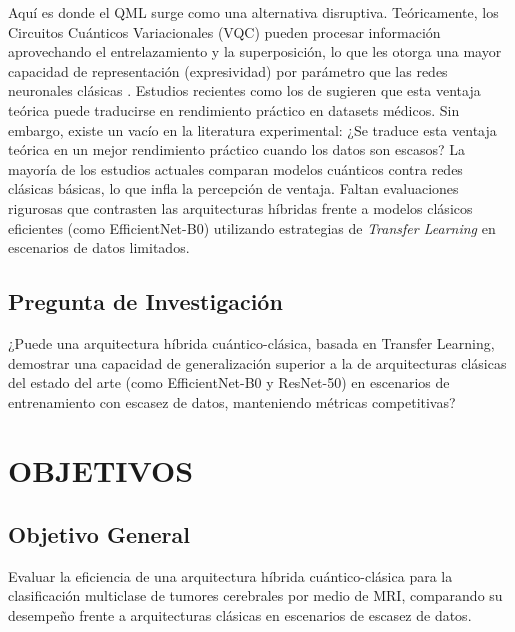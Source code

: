 \documentclass[12pt,letterpaper]{article}
\begin{document}
    Aquí es donde el QML surge como una alternativa disruptiva.
    Teóricamente, los Circuitos Cuánticos Variacionales (VQC) pueden procesar información aprovechando el entrelazamiento y la superposición, lo que les otorga una mayor capacidad de representación (expresividad) por parámetro que las redes neuronales clásicas \citep{schuld2019feature}.
    Estudios recientes como los de \citet{khan2024brain} sugieren que esta ventaja teórica puede traducirse en rendimiento práctico en datasets médicos.
    Sin embargo, existe un vacío en la literatura experimental: ¿Se traduce esta ventaja teórica en un mejor rendimiento práctico cuando los datos son escasos?
    La mayoría de los estudios actuales comparan modelos cuánticos contra redes clásicas básicas, lo que infla la percepción de ventaja.
    Faltan evaluaciones rigurosas que contrasten las arquitecturas híbridas frente a modelos clásicos eficientes (como EfficientNet-B0) utilizando estrategias de \textit{Transfer Learning} en escenarios de datos limitados.

    \subsection{Pregunta de Investigación}
    \vspace{-0.5cm}
    ¿Puede una arquitectura híbrida cuántico-clásica, basada en Transfer Learning, demostrar una capacidad de generalización superior a la de arquitecturas clásicas del estado del arte (como EfficientNet-B0 y ResNet-50) en escenarios de entrenamiento con escasez de datos, manteniendo métricas competitivas?

    \newpage
    \section{OBJETIVOS}
    \vspace{-0.5cm}

    \subsection{Objetivo General}
    \vspace{-0.5cm}
    Evaluar la eficiencia de una arquitectura híbrida cuántico-clásica para la clasificación multiclase de tumores cerebrales por medio de MRI, comparando su desempeño frente a arquitecturas clásicas en escenarios de escasez de datos.
\end{document}
